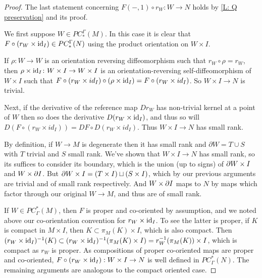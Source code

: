 \begin{proof}
The last statement concerning $F(-,1)\circ r_W: W \to N$ holds by \cref{L: Q preservation} and its proof.

We first suppose $W\in PC_*^\Gamma(M)$. In this case it is clear that $F\circ (r_W\times \mathrm{id}_I)\in  PC_*^\Gamma(N)$ using the product orientation on $W\times I$.

	If $\rho \colon W \to W$ is an orientation reversing diffeomorphism such that $r_W\circ \rho=r_W$, then
	 $\rho \times \mathrm{id}_I \colon W \times I \to W\times I$ is an orientation-reversing self-diffeomorphism of $W \times I$ such that $F\circ(r_W \times id_I)\circ (\rho \times \mathrm{id}_I)=F\circ(r_W \times id_I)$.
	 So $W \times I \to N$ is trivial.

	Next, if the derivative of the reference map $Dr_W$ has non-trivial kernel at a point of $W$ then so does
	 the derivative $D(r_W \times \mathrm{id}_I)$, and thus so
	  will $D(F\circ (r_W \times id_I))=DF\circ D(r_W \times id_I)$.  Thus $W \times I \to N$ has small rank.

	By definition, if $W \to M$ is degenerate then it has small rank and  $\partial W = T \cup S$ with $T$ trivial and $S$ small rank.
	We've shown that $W \times I \to N$ has small rank, so its suffices to consider its boundary,
	which is the union (up to signs) of  $\partial W\times I$ and $W\times \partial I$.   But $\partial W \times I = (T \times I) \sqcup (S \times I)$, which by our previous
	arguments are trivial and of small rank respectively.  And $W \times \partial I$ maps to $N$ by maps which factor through our original $W \to M$,
	and thus are of small rank.


If $W\in PC^*_\Gamma(M)$, then $F$ is proper and co-oriented by assumption, and we noted above our co-orientation convention for $r_W\times \mathrm{id}_I$. To see the latter is proper, if $K$ is compact in $M\times I$, then $K\subset \pi_M(K)\times I$, which is also compact. Then $(r_W\times \mathrm{id}_I)^{-1}(K)\subset (r_W\times \mathrm{id}_I)^{-1}(\pi_M(K)\times I)=r_W^{-1}(\pi_M(K))\times I$, which is compact as $r_W$ is proper.
As compositions of proper co-oriented maps are proper and co-oriented,  $F\circ (r_W\times \mathrm{id}_I):W\times I\to N$ is well defined in $PC^*_\Gamma(N)$. The remaining arguments are analogous to the compact oriented case.
\end{proof}

